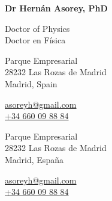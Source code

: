 \begin{center}
	{\huge \bf Dr Hernán Asorey, PhD}\\
\end{center}
\begin{center}
\ifeng
	Doctor of Physics\\[0.8cm]
\else
	Doctor en Física\\[0.8cm]
\fi
\end{center}

\ifper
	\ifeng
		\begin{minipage}[t]{0.60\textwidth}
			Parque Empresarial\\
			28232 Las Rozas de Madrid\\
			Madrid, Spain\\
		\end{minipage}
		\hspace*{0.02\textwidth}
		\begin{minipage}[t]{0.40\textwidth}
			\href{mailto:asoreyh@gmail.com}{asoreyh@gmail.com}\\
			\href{tel:+34660098884}{+34 660 09 88 84}
		\end{minipage}
	\else
		\begin{minipage}[t]{0.60\textwidth}
			Parque Empresarial\\
			28232 Las Rozas de Madrid\\
			Madrid, España\\
		\end{minipage}
		\hspace*{0.02\textwidth}
		\begin{minipage}[t]{0.40\textwidth}
			\href{mailto:asoreyh@gmail.com}{asoreyh@gmail.com}\\
			\href{tel:+34660098884}{+34 660 09 88 84}
		\end{minipage}
	\fi
\else

